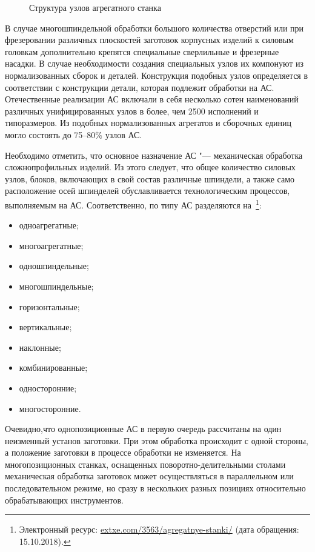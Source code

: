 \begin{figure}[ht]
	\caption{Структура узлов агрегатного станка}\label{fig:agr-machine}
\end{figure}

В случае многошпиндельной обработки большого количества отверстий или при фрезеровании различных плоскостей заготовок корпусных изделий к силовым головкам дополнительно крепятся специальные сверлильные и фрезерные насадки. В случае необходимости создания специальных узлов их компонуют из нормализованных сборок и деталей. Конструкция подобных узлов определяется в соответствии с конструкции детали, которая подлежит обработки на АС. Отечественные реализации АС включали в себя несколько сотен наименований различных унифицированных узлов в более, чем 2500 исполнений и типоразмеров. Из подобных нормализованных агрегатов и сборочных единиц могло состоять до 75--80\% узлов АС.

Необходимо отметить, что основное назначение АС "--- механическая обработка сложнопрофильных изделий. Из этого следует, что общее количество силовых узлов, блоков, включающих в свой состав различные шпиндели, а также само расположение осей шпинделей обуславливается технологическим процессов, выполняемым на АС. Соответственно, по типу АС разделяются на~\footnote{Электронный ресурс: {\tiny\url{extxe.com/3563/agregatnye-stanki/}} (дата обращения: 15.10.2018).}: 

\begin{itemize}
	\item одноагрегатные;
	\item многоагрегатные;
	\item одношпиндельные;
	\item многошпиндельные;
	\item горизонтальные;
	\item вертикальные;
	\item наклонные;
	\item комбинированные;
	\item односторонние;
	\item многосторонние.
\end{itemize}

Очевидно,что однопозиционные АС в первую очередь рассчитаны на один неизменный установ заготовки. При этом обработка происходит с одной стороны, а положение заготовки в процессе обработки не изменяется. На многопозиционных станках, оснащенных поворотно-делительными столами механическая обработка заготовок может осуществляться в параллельном или последовательном режиме, но сразу в нескольких разных позициях относительно обрабатывающих инструментов.

